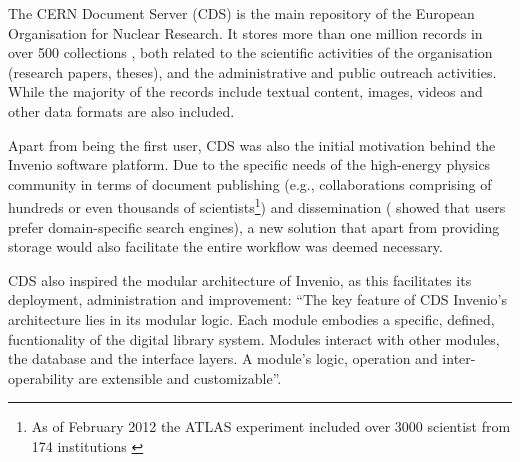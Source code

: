 
The CERN Document Server (CDS) is the main repository of the European
Organisation for Nuclear Research.  It stores more than one million
records\cite{ref:cds} in over 500 collections \cite{ref:ludmilathesis}, both
related to the scientific activities of the organisation (research papers,
theses), and the administrative and public outreach activities. While the
majority of the records include textual content, images, videos and other data
formats are also included.

Apart from being the first user, CDS was also the initial motivation behind the
Invenio software platform. Due to the specific needs of the high-energy physics
community in terms of document publishing (e.g., collaborations comprising of
hundreds or even thousands of scientists\footnote{As of February 2012 the
ATLAS experiment included over 3000 scientist from 174 institutions
\cite{ref:atlas}}) and dissemination (\cite{ref:annette} showed that users
prefer domain-specific search engines), a new solution that apart from providing
storage would also facilitate the entire workflow was deemed necessary.

CDS also inspired the modular architecture of Invenio, as this facilitates its
deployment, administration and improvement: ``The key feature of CDS Invenio's
architecture lies in its modular logic. Each module embodies a specific,
defined, fucntionality of the digital library system. Modules interact with
other modules, the database and the interface layers. A module's logic,
operation and inter-operability are extensible and
customizable''\cite{ref:lemeur}.

